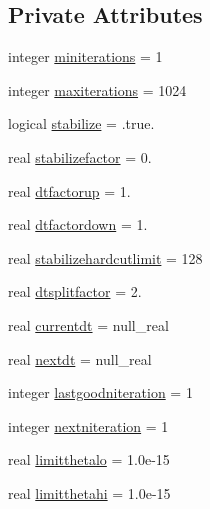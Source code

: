 \subsection*{Private Attributes}
\begin{DoxyCompactItemize}
\item 
integer \mbox{\hyperlink{structmoduleporousmedia_1_1t__converge_ab0fc7f8241e2c0803c211f6ec1b87675}{miniterations}} = 1
\item 
integer \mbox{\hyperlink{structmoduleporousmedia_1_1t__converge_a95653ab7003461da196cbb278e4971b9}{maxiterations}} = 1024
\item 
logical \mbox{\hyperlink{structmoduleporousmedia_1_1t__converge_a607ca19924763b5c25e1057c175592d6}{stabilize}} = .true.
\item 
real \mbox{\hyperlink{structmoduleporousmedia_1_1t__converge_a58bc961b978e787c279f6ea4a0f6bc09}{stabilizefactor}} = 0.
\item 
real \mbox{\hyperlink{structmoduleporousmedia_1_1t__converge_ab2a67108a3c52c72a57e3423e29a2314}{dtfactorup}} = 1.
\item 
real \mbox{\hyperlink{structmoduleporousmedia_1_1t__converge_aa2435457ede8637dbc14bf3ce37c7cb3}{dtfactordown}} = 1.
\item 
real \mbox{\hyperlink{structmoduleporousmedia_1_1t__converge_afba927b7a236248296cfea91c8377b2a}{stabilizehardcutlimit}} = 128
\item 
real \mbox{\hyperlink{structmoduleporousmedia_1_1t__converge_a39c4d1ddb63f7cb251a3e5f6a3552765}{dtsplitfactor}} = 2.
\item 
real \mbox{\hyperlink{structmoduleporousmedia_1_1t__converge_a27d553a93abda49b6e4f7eac2d96bd6a}{currentdt}} = null\+\_\+real
\item 
real \mbox{\hyperlink{structmoduleporousmedia_1_1t__converge_a855b3b74fe9fa5ca8ce9f2bea724e450}{nextdt}} = null\+\_\+real
\item 
integer \mbox{\hyperlink{structmoduleporousmedia_1_1t__converge_a27e9b05d6a61ca0c0b3884f64ed7e8ad}{lastgoodniteration}} = 1
\item 
integer \mbox{\hyperlink{structmoduleporousmedia_1_1t__converge_a3300ca3a279b86506187116daccda567}{nextniteration}} = 1
\item 
real \mbox{\hyperlink{structmoduleporousmedia_1_1t__converge_aa8d2d3832f558d9e2d0af2052769098a}{limitthetalo}} = 1.\+0e-\/15
\item 
real \mbox{\hyperlink{structmoduleporousmedia_1_1t__converge_a37c7def22ba8a5c7e2720e98be1e6718}{limitthetahi}} = 1.\+0e-\/15

\end{DoxyCompactItemize}
